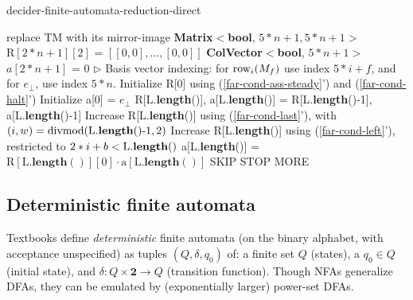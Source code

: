 \begin{algorithm}
  \caption{{\sc decider-finite-automata-reduction-direct}}\label{alg:finite-automata-reduction-direct}

  \begin{algorithmic}[1]
     replace TM with its mirror-image
    \EndIf
    \State \textbf{Matrix$\boldsymbol<$bool}, $5*n+1, 5*n+1\boldsymbol>$ $\textrm{R}[2*n+1][2]$ = $[[0,0],\ldots,[0,0]]$
    \State \textbf{ColVector$\boldsymbol<$bool}, $5*n+1\boldsymbol>$ $a[2*n+1]$ = 0
    \State \(\triangleright\) Basis vector indexing: for $\text{row}_i(M_f)$ use index $5*i+f$, and for $e_\bot$, use index $5*n$.
    \State Initialize R[0] using (\ref{far-cond-ass-steady}') and (\ref{far-cond-halt}')
    \State Initialize a[0] = $e_\bot$
    \State R[L.\textbf{length}()], a[L.\textbf{length}()] = R[L.\textbf{length}()-1], a[L.\textbf{length}()-1]
    \State Increase R[L.\textbf{length}()] using (\ref{far-cond-last}'), with $(i,w)=\operatorname{divmod}(\textrm{L.\textbf{length}()-1}, 2)$
    \Repeat
    \State Increase R[L.\textbf{length}()] using (\ref{far-cond-left}'), restricted to $2*i+b<\textrm{L.\textbf{length}()}$
    \Repeat
    \State a[L.\textbf{length}()] = $\textrm{R}[\textrm{L}.\textbf{length}()][0] \cdot \textrm{a}[\textrm{L}.\textbf{length}()]$
    \Return SKIP
    \Return STOP
    \Else\;\Return MORE
    \EndIf
    \EndProcedure
    \State \Return {}
    \EndProcedure
  \end{algorithmic}
\end{algorithm}

\subsection{Deterministic finite automata}
\label{far-defs-dfa}
Textbooks define \emph{deterministic} finite automata (on the binary alphabet, with acceptance unspecified) as tuples $(Q, \delta, q_0)$ of: a finite set $Q$ (states), a $q_0\in Q$ (initial state), and $\delta: Q\times\mathbf{2}\to Q$ (transition function).
Though NFAs generalize DFAs, they can be emulated by (exponentially larger) power-set DFAs. \cite{Sipser}

